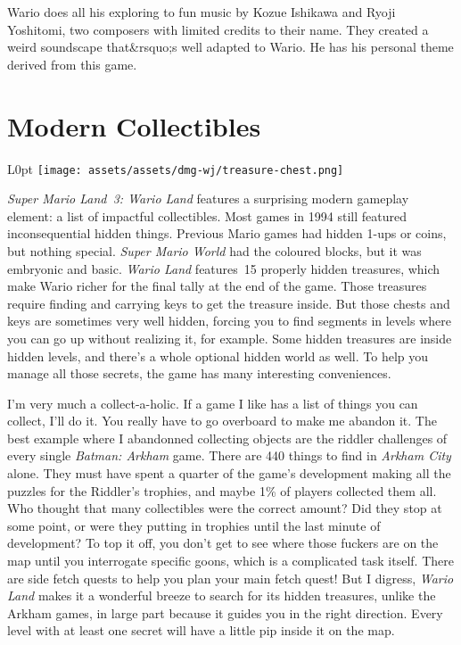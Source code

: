 \documentclass{book}
\begin{document}
Wario does all his exploring to fun music by Kozue Ishikawa and Ryoji Yoshitomi, two composers with limited credits to their name. They created a weird soundscape that&rsquo;s well adapted to Wario. He has his personal theme derived from this game.

\FloatBarrier\needspace{10mm}\section*{Modern Collectibles}\nopagebreak[4]

\begin{wrapfigure}{L}{0pt} \texttt{[image: assets/assets/dmg-wj/treasure-chest.png]}\end{wrapfigure}

\emph{Super Mario Land~3: Wario Land} features a surprising modern gameplay element: a list of impactful collectibles. Most games in 1994 still featured inconsequential hidden things. Previous Mario games had hidden 1-ups or coins, but nothing special. \emph{Super Mario World} had the coloured blocks, but it was embryonic and basic. \emph{Wario Land} features~15 properly hidden treasures, which make Wario richer for the final tally at the end of the game. Those treasures require finding and carrying keys to get the treasure inside. But those chests and keys are sometimes very well hidden, forcing you to find segments in levels where you can go up without realizing it, for example. Some hidden treasures are inside hidden levels, and there’s a whole optional hidden world as well. To help you manage all those secrets, the game has many interesting conveniences.

I’m very much a collect-a-holic. If a game I like has a list of things you can collect, I’ll do it. You really have to go overboard to make me abandon it. The best example where I abandonned collecting objects are the riddler challenges of every single \emph{Batman: Arkham} game. There are 440 things to find in \emph{Arkham City} alone. They must have spent a quarter of the game’s development making all the puzzles for the Riddler’s trophies, and maybe 1\% of players collected them all. Who thought that many collectibles were the correct amount? Did they stop at some point, or were they putting in trophies until the last minute of development? To top it off, you don’t get to see where those fuckers are on the map until you interrogate specific goons, which is a complicated task itself. There are side fetch quests to help you plan your main fetch quest! But I digress, \emph{Wario Land} makes it a wonderful breeze to search for its hidden treasures, unlike the Arkham games, in large part because it guides you in the right direction. Every level with at least one secret will have a little pip inside it on the map.
\end{document}
